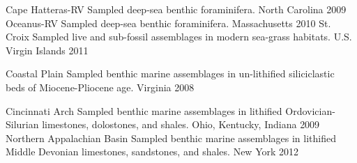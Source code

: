 \begin{cvhonors}
  \cvhonor
    {Cape Hatteras-RV}
    {Sampled deep-sea benthic foraminifera.}
    {North Carolina}
    {2009}
  \cvhonor
    {Oceanus-RV}
    {Sampled deep-sea benthic foraminifera.}
    {Massachusetts}
    {2010}
  \cvhonor
    {St. Croix}
    {Sampled live and sub-fossil assemblages in modern sea-grass habitats.}
    {U.S. Virgin Islands}
    {2011}
\end{cvhonors}

\begin{cvhonors}
  \cvhonor
    {Coastal Plain}
    {Sampled benthic marine assemblages in un-lithified siliciclastic beds of Miocene-Pliocene age.}
    {Virginia}
    {2008}
\end{cvhonors}

\begin{cvhonors}
  \cvhonor
    {Cincinnati Arch}
    {Sampled benthic marine assemblages in lithified Ordovician-Silurian limestones, dolostones, and shales.}
    {Ohio, Kentucky, Indiana}
    {2009}
  \cvhonor
    {Northern Appalachian Basin}
    {Sampled benthic marine assemblages in lithified Middle Devonian limestones, sandstones, and shales.}
    {New York}
    {2012}
\end{cvhonors}